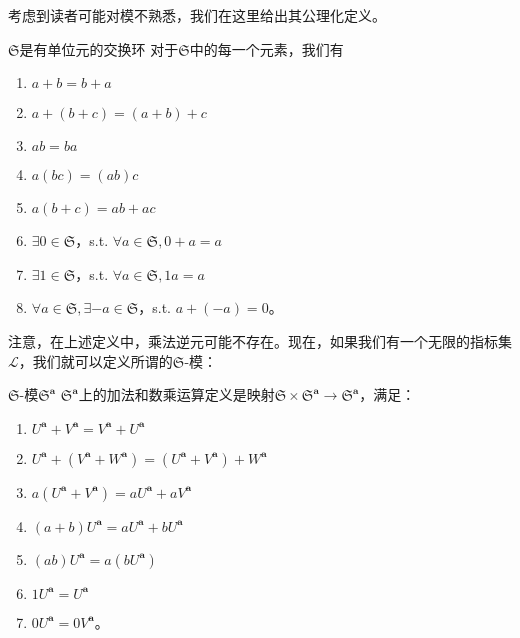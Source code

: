 考虑到读者可能对模不熟悉，我们在这里给出其公理化定义。

\begin{defi}[label={defi:fraS and commutative ring}]{$\mathfrak{S}$是有单位元的交换环}
	对于$\mathfrak{S}$中的每一个元素，我们有
	\begin{enumerate}[label=(\alph*)]
		\item $a+b=b+a$
		\item $a+(b+c)=(a+b)+c$
		\item $ab=ba$
		\item $a(bc)=(ab)c$
		\item $a(b+c)=ab+ac$
		\item $\exists 0\in \mathfrak{S}$，s.t. $\forall a\in \mathfrak{S} ,0+a=a$
		\item $\exists 1\in \mathfrak{S}$，s.t. $\forall a\in \mathfrak{S} ,1a=a$
		\item $\forall a\in \mathfrak{S} ,\exists -a\in \mathfrak{S}$，s.t. $a+( -a) =0$。
	\end{enumerate}
\end{defi}

注意，在上述定义中，乘法逆元可能不存在。现在，如果我们有一个无限的指标集$\mathcal{L}$，我们就可以定义所谓的$\mathfrak{S}$-模：

\begin{defi}[label={defi:fraSa}]{$\mathfrak{S}$-模$\mathfrak{S}^{\boldsymbol{a}}$}
	$\mathfrak{S}^{\boldsymbol{a}}$上的加法和数乘运算定义是映射$\mathfrak{S} \times \mathfrak{S}^{\boldsymbol{a}}\rightarrow \mathfrak{S}^{\boldsymbol{a}}$，满足：
	\begin{enumerate}[label=(\alph*)]
		\item $U^{\boldsymbol{a}} +V^{\boldsymbol{a}} =V^{\boldsymbol{a}} +U^{\boldsymbol{a}}$
		\item $U^{\boldsymbol{a}} +(V^{\boldsymbol{a}} +W^{\boldsymbol{a}} )=(U^{\boldsymbol{a}} +V^{\boldsymbol{a}} )+W^{\boldsymbol{a}}$
		\item $a(U^{\boldsymbol{a}} +V^{\boldsymbol{a}} )=aU^{\boldsymbol{a}} +aV^{\boldsymbol{a}}$
		\item $(a+b)U^{\boldsymbol{a}} =aU^{\boldsymbol{a}} +bU^{\boldsymbol{a}}$
		\item $(ab)U^{\boldsymbol{a}} =a(bU^{\boldsymbol{a}} )$
		\item $1U^{\boldsymbol{a}} =U^{\boldsymbol{a}}$
		\item $0U^{\boldsymbol{a}} =0V^{\boldsymbol{a}}$。
	\end{enumerate}
\end{defi}

